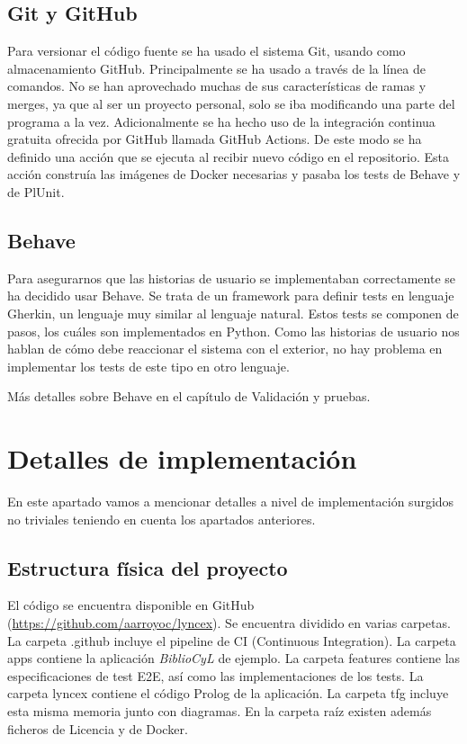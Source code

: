 \documentclass[openright,twoside,12pt]{book}
\begin{document}
\subsection{Git y GitHub}
Para versionar el código fuente se ha usado el sistema Git, usando como almacenamiento GitHub. Principalmente se ha usado a través de la línea de comandos.
No se han aprovechado muchas de sus características de ramas y merges, ya que al ser un proyecto personal, solo se iba modificando una parte del programa a la vez.
Adicionalmente se ha hecho uso de la integración continua gratuita ofrecida por GitHub llamada GitHub Actions. De este modo se ha definido una acción que se ejecuta al recibir nuevo código en el repositorio.
Esta acción construía las imágenes de Docker necesarias y pasaba los tests de Behave y de PlUnit.

\subsection{Behave}
Para asegurarnos que las historias de usuario se implementaban correctamente se ha decidido usar Behave.
Se trata de un framework para definir tests en lenguaje Gherkin, un lenguaje muy similar al lenguaje natural. Estos tests se componen de pasos,
los cuáles son implementados en Python. Como las historias de usuario nos hablan de cómo debe reaccionar el sistema con el exterior, no hay problema en implementar los tests de este tipo en otro lenguaje.

Más detalles sobre Behave en el capítulo de Validación y pruebas.

\section{Detalles de implementación}

En este apartado vamos a mencionar detalles a nivel de implementación surgidos no triviales teniendo en cuenta los apartados anteriores.

\subsection{Estructura física del proyecto}
El código se encuentra disponible en GitHub (\url{https://github.com/aarroyoc/lyncex}). Se encuentra dividido en varias carpetas. La carpeta .github incluye el pipeline de CI (Continuous Integration). La carpeta apps contiene la aplicación \textit{BiblioCyL} de ejemplo. La carpeta features contiene las especificaciones de test E2E, así como las implementaciones de los tests. La carpeta lyncex contiene el código Prolog de la aplicación. La carpeta tfg incluye esta misma memoria junto con diagramas. En la carpeta raíz existen además ficheros de Licencia y de Docker.
\end{document}
